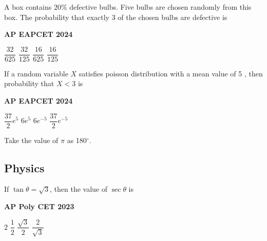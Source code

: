 \documentclass[11pt,paper=a4,answers]{exam}
\begin{document}
\begin{multicols}{2}
\begin{questions}
\question
A box contains $20 \%$ defective bulbs. Five bulbs are chosen randomly from this box. The probability that exactly 3 of the chosen bulbs are defective is
\begin{flushright}
\small\textbf{AP EAPCET 2024}
\end{flushright}
\begin{choices}
  \choice $\dfrac{32}{625}$
  \choice $\dfrac{32}{125}$
  \choice $\dfrac{16}{625}$
  \choice $\dfrac{16}{125}$
\end{choices}


\question
If a random variable $X$ satisfies poisson distribution with a mean value of 5 , then probability that $X<3$ is
\begin{flushright}
\small\textbf{AP EAPCET 2024}
\end{flushright}
\begin{choices}
  \choice $\dfrac{37}{2} e^5$
  \choice $6 e^5$ 
  \choice $6 e^{-5}$ 
  \choice $\dfrac{37}{2} e^{-5}$
\end{choices}





\end{questions}
\end{multicols}

\begin{center}
  \Large{Take the value of $\pi$ as 180${^\circ}$.}
\end{center}

\newpage



\subsection*{Physics}
\begin{multicols}{2}
\begin{questions}
\question
If $\tan  \theta = \sqrt{3}$, then the value of $\sec \theta$ is
\begin{flushright}
\small\textbf{AP Poly CET 2023}
\end{flushright}


\begin{choices}
\choice $\displaystyle 2$ 
\choice $\displaystyle \dfrac{1}{2}$ 
\choice $\displaystyle \dfrac{\sqrt{3}}{2}$ 
\choice $\displaystyle \dfrac{2}{\sqrt{3}}$  
\end{choices}
\end{questions}

\end{multicols}
\end{document}

